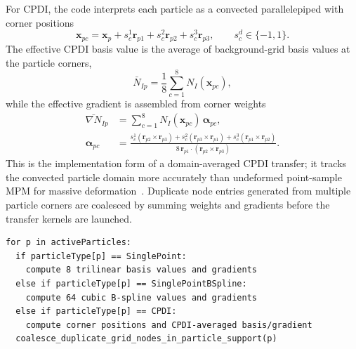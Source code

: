 For CPDI, the code interprets each particle as a convected parallelepiped with corner positions
\begin{equation}
  \mathbf{x}_{pc}=\mathbf{x}_p+s_c^1\mathbf{r}_{p1}+s_c^2\mathbf{r}_{p2}+s_c^3\mathbf{r}_{p3},
  \qquad s_c^d\in\{-1,1\}.
\end{equation}
The effective CPDI basis value is the average of background-grid basis values at the particle corners,
\begin{equation}
  \bar{N}_{Ip}=\frac{1}{8}\sum_{c=1}^{8} N_I(\mathbf{x}_{pc}),
\end{equation}
while the effective gradient is assembled from corner weights
\begin{align}
  \bar{\nabla N}_{Ip} &= \sum_{c=1}^{8} N_I(\mathbf{x}_{pc})\,\boldsymbol{\alpha}_{pc}, \\
  \boldsymbol{\alpha}_{pc} &= \frac{s_c^1(\mathbf{r}_{p2}\times\mathbf{r}_{p3})+s_c^2(\mathbf{r}_{p3}\times\mathbf{r}_{p1})+s_c^3(\mathbf{r}_{p1}\times\mathbf{r}_{p2})}{8\,\mathbf{r}_{p1}\cdot(\mathbf{r}_{p2}\times\mathbf{r}_{p3})}.
\end{align}
This is the implementation form of a domain-averaged CPDI transfer; it tracks the convected particle domain more accurately than undeformed point-sample MPM for massive deformation~\cite{sadeghirad2011cpdi}.  Duplicate node entries generated from multiple particle corners are coalesced by summing weights and gradients before the transfer kernels are launched.

\begin{lstlisting}[caption={Particle-grid mapping.},basicstyle=\ttfamily\small]
for p in activeParticles:
  if particleType[p] == SinglePoint:
    compute 8 trilinear basis values and gradients
  else if particleType[p] == SinglePointBSpline:
    compute 64 cubic B-spline values and gradients
  else if particleType[p] == CPDI:
    compute corner positions and CPDI-averaged basis/gradient
  coalesce_duplicate_grid_nodes_in_particle_support(p)
\end{lstlisting}

